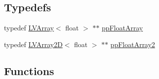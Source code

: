 \subsection*{Typedefs}
\begin{DoxyCompactItemize}
\item 
typedef \hyperlink{struct_l_v_array}{L\+V\+Array}$<$ float $>$ $\ast$$\ast$ \hyperlink{group__lab__functions_gaf69538484a43fed57d6ee809dfbaff15}{pp\+Float\+Array}
\item 
typedef \hyperlink{struct_l_v_array2_d}{L\+V\+Array2D}$<$ float $>$ $\ast$$\ast$ \hyperlink{group__lab__functions_ga9a0eab7581aef17aa559d7138d7574f8}{pp\+Float\+Array2}
\end{DoxyCompactItemize}
\subsection*{Functions}
